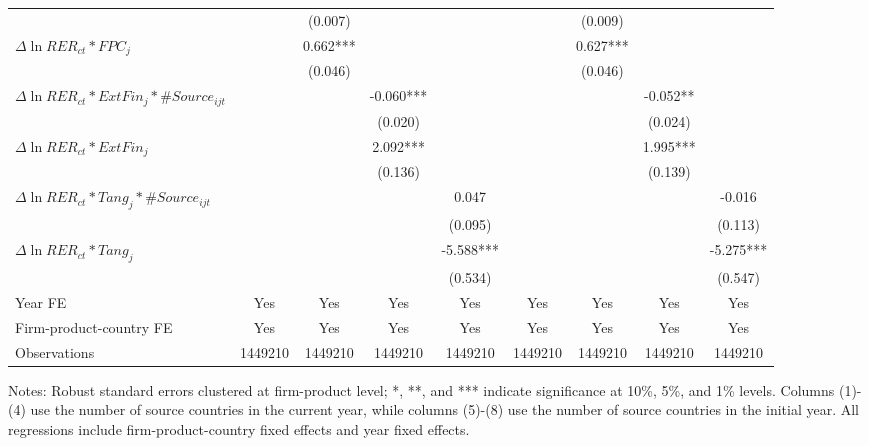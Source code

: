 \documentclass[12pt]{article}
\begin{document}
\begin{table}
{\begin{threeparttable}
\begin{tabular}{lcccccccc}
			&       & (0.007) &       &  &       & (0.009) &       &\\
			$\Delta \ln RER_{ct}*FPC_{j}$ &       & 0.662*** &       &  &       & 0.627*** &       &\\
			&       & (0.046) &       & &       & (0.046) &       & \\
			$\Delta \ln RER_{ct}*ExtFin_{j}*\#Source_{ijt}$ &       &    &   -0.060*** &  &       &    &   -0.052** &\\
			&       &       & (0.020) &  &       &       & (0.024) &\\
			$\Delta \ln RER_{ct}*ExtFin_{j}$ &       &       & 2.092*** &   &       &       & 1.995*** &\\
			&       &       & (0.136) &  &       &       & (0.139) &\\
			$\Delta \ln RER_{ct}*Tang_{j}*\#Source_{ijt}$ &       &       &       & 0.047 &       &       &       & -0.016\\
			&       &       &       & (0.095) &       &       &       & (0.113)\\
			$\Delta \ln RER_{ct}*Tang_{j}$ &       &       &       & -5.588*** &       &       &       & -5.275***\\
			&       &       &       & (0.534) &       &       &       & (0.547)\\
			Year FE  & Yes   & Yes   & Yes   & Yes & Yes   & Yes   & Yes   & Yes\\
			Firm-product-country FE & Yes   & Yes   & Yes   & Yes & Yes   & Yes   & Yes   & Yes\\
			Observations & 1449210 & 1449210 & 1449210 & 1449210 & 1449210 & 1449210 & 1449210 & 1449210\\
			\bottomrule
		\end{tabular}
		\begin{tablenotes}
			\footnotesize
			\item[Notes:] Robust standard errors clustered at firm-product level; *, **, and *** indicate significance at 10\%, 5\%, and 1\% levels. Columns (1)-(4) use the number of source countries in the current year, while columns (5)-(8) use the number of source countries in the initial year. All regressions include firm-product-country fixed effects and year fixed effects.
		\end{tablenotes}
	\end{threeparttable}
	}
	\label{tab.source}
\end{table}
\end{document}
